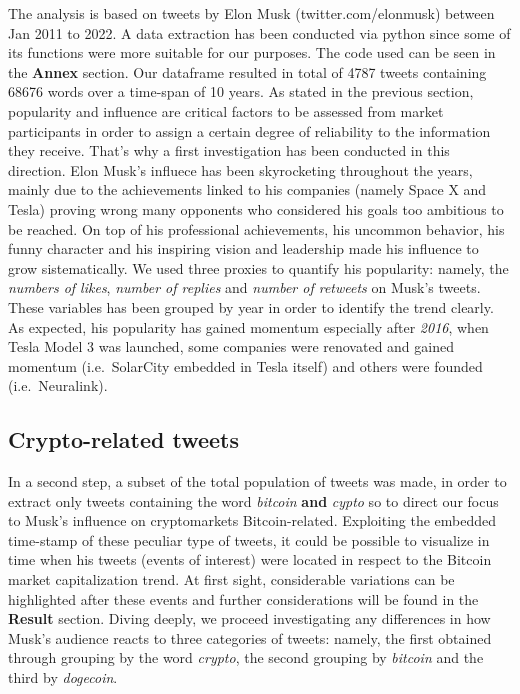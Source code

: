 \documentclass[
]{article}
\begin{document}
The analysis is based on tweets by Elon Musk (twitter.com/elonmusk)
between Jan 2011 to 2022. A data extraction has been conducted via
python since some of its functions were more suitable for our purposes.
The code used can be seen in the \textbf{Annex} section. Our dataframe
resulted in total of 4787 tweets containing 68676 words over a time-span
of 10 years. As stated in the previous section, popularity and influence
are critical factors to be assessed from market participants in order to
assign a certain degree of reliability to the information they receive.
That's why a first investigation has been conducted in this direction.
Elon Musk's influece has been skyrocketing throughout the years, mainly
due to the achievements linked to his companies (namely Space X and
Tesla) proving wrong many opponents who considered his goals too
ambitious to be reached. On top of his professional achievements, his
uncommon behavior, his funny character and his inspiring vision and
leadership made his influence to grow sistematically. We used three
proxies to quantify his popularity: namely, the \emph{numbers of likes},
\emph{number of replies} and \emph{number of retweets} on Musk's tweets.
These variables has been grouped by year in order to identify the trend
clearly. As expected, his popularity has gained momentum especially
after \emph{2016}, when Tesla Model 3 was launched, some companies were
renovated and gained momentum (i.e.~SolarCity embedded in Tesla itself)
and others were founded (i.e.~Neuralink).

\hypertarget{crypto-related-tweets}{%
\subsection{Crypto-related tweets}\label{crypto-related-tweets}}

In a second step, a subset of the total population of tweets was made,
in order to extract only tweets containing the word \emph{bitcoin}
\textbf{and} \emph{cypto} so to direct our focus to Musk's influence on
cryptomarkets Bitcoin-related. Exploiting the embedded time-stamp of
these peculiar type of tweets, it could be possible to visualize in time
when his tweets (events of interest) were located in respect to the
Bitcoin market capitalization trend. At first sight, considerable
variations can be highlighted after these events and further
considerations will be found in the \textbf{Result} section. Diving
deeply, we proceed investigating any differences in how Musk's audience
reacts to three categories of tweets: namely, the first obtained through
grouping by the word \emph{crypto}, the second grouping by
\emph{bitcoin} and the third by \emph{dogecoin}.
\end{document}
